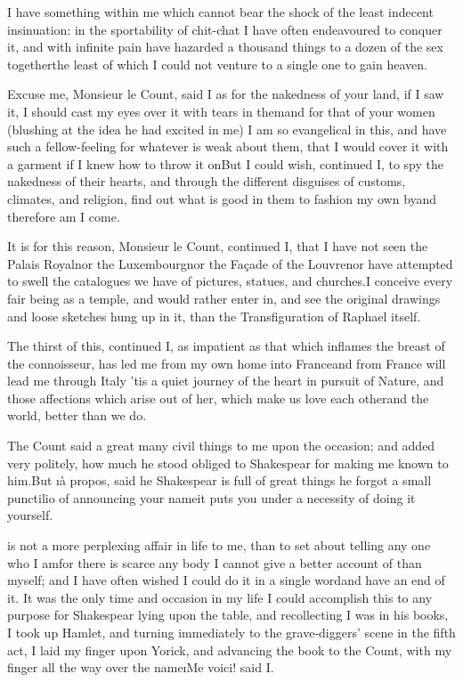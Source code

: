 \documentclass[twoside]{article}
\begin{document}
I have something within me which cannot
bear the shock of the least indecent
insinuation: in the sportability of
chit-chat I have often endeavoured to
conquer it, and with infinite pain have
hazarded a thousand things to a dozen of
the sex together\tskk the least of which
I could not venture to a single one to
gain heaven.

Excuse me, Monsieur le Count, said I\tskk
as for the nakedness of your land, if I
saw it, I should cast my eyes over it with
tears in them\tskk and for that of your
women (blushing at the idea he had excited
in me) I am so evangelical in this, and
have such a fellow-feeling for whatever is
weak about them, that I would cover it
with a garment if I knew how to throw it
on\tskk But I could wish, continued I, to
spy the nakedness of their hearts, and
through the different disguises of
customs, climates, and religion, find out
what is good in them to fashion my own
by\tskk and therefore am I come.

It is for this reason, Monsieur le Count,
continued I, that I have not seen the
Palais Royal\tskk nor the
Luxembourg\tskk nor the Façade of the
Louvre\tskk nor have attempted to swell
the catalogues we have of pictures,
statues, and churches.\tskk I conceive
every fair being as a temple, and would
rather enter in, and see the original
drawings and loose sketches hung up in it,
than the Transfiguration of Raphael
itself.

The thirst of this, continued I, as
impatient as that which inflames the
breast of the connoisseur, has led me from
my own home into France\tskk and from
France will lead me through Italy\tskk
’tis a quiet journey of the heart in
pursuit of Nature, and those affections
which arise out of her, which make us love
each other\tskk and the world, better
than we do.

The Count said a great many civil things
to me upon the occasion; and added very
politely, how much he stood obliged to
Shakespear for making me known to
him.\tskk But \i{à propos}, said he\tskk
Shakespear is full of great things\tskk
he forgot a small punctilio of announcing
your name\tskk it puts you under a
necessity of doing it yourself.





\vskip 6pt


 is not a more perplexing
affair in life to me, than to set about
telling any one who I am\tskk for there
is scarce any body I cannot give a better
account of than myself; and I have often
wished I could do it in a single
word\tskk and have an end of it.  It was
the only time and occasion in my life I
could accomplish this to any purpose\tskk
for Shakespear lying upon the table, and
recollecting I was in his books, I took up
Hamlet, and turning immediately to the
grave-diggers’ scene in the fifth act, I
laid my finger upon Yorick, and advancing
the book to the Count, with my finger all
the way over the name\tskk \i{Me voici}!
said I.
\end{document}
